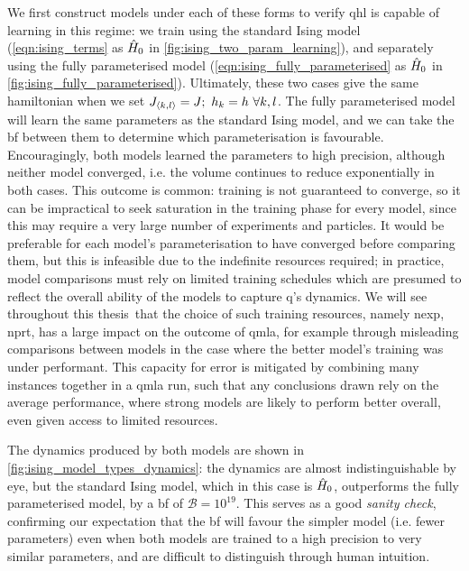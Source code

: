 We first construct models under each of these forms to verify \gls{qhl} is capable of learning in this regime:
we train using the standard Ising model (\cref{eqn:ising_terms} as $\hat{H}_0$ in \cref{fig:ising_two_param_learning}),
and separately using the fully parameterised model (\cref{eqn:ising_fully_parameterised} as $\hat{H}_0$ in \cref{fig:ising_fully_parameterised}).
Ultimately, these two cases give the same \gls{hamiltonian} when we set $J_{{ \langle k, l \rangle }} = J; \ h_k = h \ \forall k,l$.
The fully parameterised model will learn the same parameters as the standard Ising model,
and we can take the \gls{bf} between them to determine which parameterisation is favourable.
Encouragingly, both models learned the parameters to high precision, although neither model converged,
i.e. the \gls{volume} continues to reduce exponentially in both cases.
This outcome is common: training is not guaranteed to converge\footnotemark, 
so it can be impractical to seek saturation in the training phase for every model, 
since this may require a very large number of \glspl{experiment} and \glspl{particle}. 
It would be preferable for each model's parameterisation to have converged before comparing them, 
but this is infeasible due to the indefinite resources required; 
in practice, model comparisons must rely on limited training schedules which are presumed to reflect the overall ability of 
the models to capture \gls{q}'s dynamics. 
We will see throughout this thesis\footnotemark \ that the choice of such training resources, namely \gls{nexp}, \gls{nprt}, 
has a large impact on the outcome of \gls{qmla}, for example through misleading comparisons between models 
in the case where the better model's training was under performant. 
This capacity for error is mitigated by combining many \glspl{instance} together in 
a \gls{qmla} \gls{run}, such that any conclusions drawn rely on the average performance, 
where strong models are likely to perform better overall, even given access to limited resources. 
\par 

The dynamics produced by both models are shown in \cref{fig:ising_model_types_dynamics}:
the dynamics are almost indistinguishable by eye, but the standard Ising model, 
which in this case is $\hat{H}_0$, outperforms the fully parameterised model, 
by a \gls{bf} of $\mathcal{B} = 10^{19}$.
This serves as a good \emph{sanity check}, confirming our expectation that 
the \gls{bf} will favour the simpler model (i.e. fewer parameters) even when both models 
are trained to a high precision to very similar parameters, and are difficult to distinguish through human intuition\footnotemark. 


